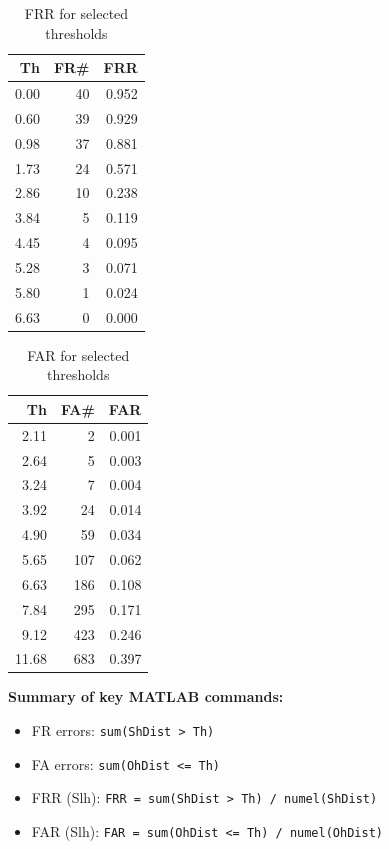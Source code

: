 \documentclass[a4paper,11pt]{article}
\begin{document}
\begin{multicols}{2}
\begin{table}[H]
\centering
\caption{FRR for selected thresholds}
\begin{tabular}{@{}rrr@{}}
\toprule
Th & FR\# & FRR \\
\midrule
0.00 & 40 & 0.952 \\
0.60 & 39 & 0.929 \\
0.98 & 37 & 0.881 \\
1.73 & 24 & 0.571 \\
2.86 & 10 & 0.238 \\
3.84 & 5  & 0.119 \\
4.45 & 4  & 0.095 \\
5.28 & 3  & 0.071 \\
5.80 & 1  & 0.024 \\
6.63 & 0  & 0.000 \\
\bottomrule
\end{tabular}
\end{table}

\columnbreak

\begin{table}[H]
\centering
\caption{FAR for selected thresholds}
\begin{tabular}{@{}rrr@{}}
\toprule
Th & FA\# & FAR \\
\midrule
2.11 & 2   & 0.001 \\
2.64 & 5   & 0.003 \\
3.24 & 7   & 0.004 \\
3.92 & 24  & 0.014 \\
4.90 & 59  & 0.034 \\
5.65 & 107 & 0.062 \\
6.63 & 186 & 0.108 \\
7.84 & 295 & 0.171 \\
9.12 & 423 & 0.246 \\
11.68 & 683 & 0.397 \\
\bottomrule
\end{tabular}
\end{table}
\end{multicols}

\noindent\textbf{Summary of key MATLAB commands:}
\begin{itemize}
    \item FR errors: \texttt{sum(ShDist > Th)}
    \item FA errors: \texttt{sum(OhDist <= Th)}
    \item FRR (Slh): \texttt{FRR = sum(ShDist > Th) / numel(ShDist)}
    \item FAR (Slh): \texttt{FAR = sum(OhDist <= Th) / numel(OhDist)}
\end{itemize}
\end{document}
